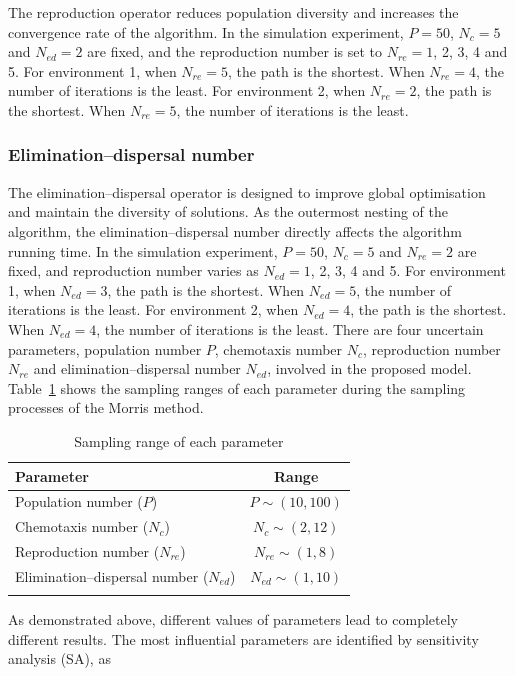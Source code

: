 \documentclass{PDS}%
\theoremstyle{definition}
\begin{document}
The reproduction operator reduces population diversity and increases the convergence rate of
the algorithm. In the simulation experiment, $P=50$, $N_c =5$ and $N_{ed}=2$ are fixed, and the
reproduction number is set to $N_{re}=1$, 2, 3, 4 and 5. For environment 1, when $N_{re}=5$, the path is the shortest. When
$N_{re}=4$, the number of iterations is the least. For environment 2, when $N_{re}=2$, the
path is the shortest. When $N_{re}=5$, the number of iterations is the least.

\subsubsection{Elimination--dispersal number}

The elimination--dispersal operator is designed to improve global optimisation and
maintain the diversity of solutions. As the outermost nesting of the algorithm, the
elimination--dispersal number directly affects the algorithm running time. In the
simulation experiment, $P=50$, $N_c=5$ and $N_{re}=2$ are fixed, and reproduction number varies as $N_{ed}=1$,
2, 3, 4 and 5. For environment 1, when
$N_{ed}=3$, the path is the shortest. When $N_{ed}=5$, the number of iterations is the
least. For environment 2, when $N_{ed}=4$, the path is the shortest. When $N_{ed}=4$, the
number of iterations is the least.
There are four uncertain parameters, population number $P$, chemotaxis number $N_c$,
reproduction number $N_{re}$ and elimination--dispersal number $N_{ed}$, involved
in the proposed model. Table~\ref{table:morrisSamples} shows the sampling ranges of each
parameter during the sampling processes of the Morris method.
\begin{table}[!h]
\centering
\caption{Sampling range of each parameter\label{table:morrisSamples}}
\begin{tabular*}{20pc}{@{\extracolsep\fill}lc@{\extracolsep\fill}}
\toprule
 Parameter & Range \\
\midrule
 Population number ($P$) & $P\sim(10,100)$ \\
 Chemotaxis number ($N_c$) & $N_c\sim(2,12)$ \\
 Reproduction number ($N_{re}$) & $N_{re}\sim(1,8)$ \\
 Elimination--dispersal number ($N_{ed}$) & $N_{ed}\sim(1,10)$ \\
\botrule
\end{tabular*}
\end{table}
As demonstrated above, different values of parameters lead to completely different
results. The most influential parameters are identified by sensitivity analysis (SA), as
\end{document}
